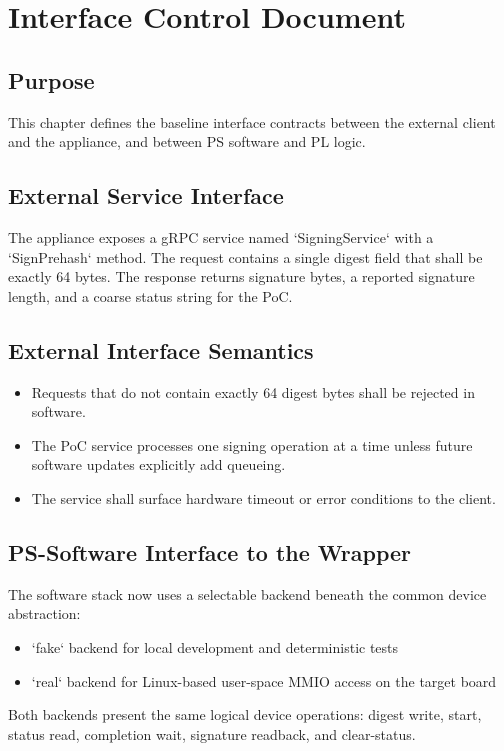 \chapter{Interface Control Document}

\section*{Purpose}
This chapter defines the baseline interface contracts between the external client and the appliance, and between PS software and PL logic.

\section{External Service Interface}
The appliance exposes a gRPC service named `SigningService` with a `SignPrehash` method. The request contains a single digest field that shall be exactly 64 bytes. The response returns signature bytes, a reported signature length, and a coarse status string for the PoC.

\section{External Interface Semantics}
\begin{itemize}[leftmargin=*]
  \item Requests that do not contain exactly 64 digest bytes shall be rejected in software.
  \item The PoC service processes one signing operation at a time unless future software updates explicitly add queueing.
  \item The service shall surface hardware timeout or error conditions to the client.
\end{itemize}

\section{PS-Software Interface to the Wrapper}
The software stack now uses a selectable backend beneath the common device abstraction:
\begin{itemize}[leftmargin=*]
  \item `fake` backend for local development and deterministic tests
  \item `real` backend for Linux-based user-space MMIO access on the target board
\end{itemize}

Both backends present the same logical device operations: digest write, start, status read, completion wait, signature readback, and clear-status.

